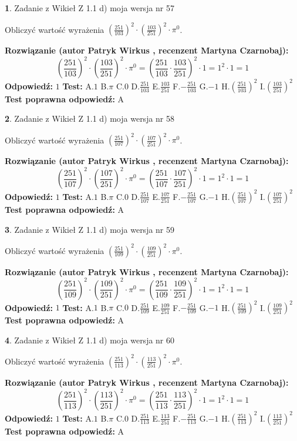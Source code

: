 \documentclass[12pt, a4paper]{article}
\theoremstyle{definition} %
\newtheorem{zad}{}
\newcommand{\zadStart}[1]{\begin{zad}#1\newline}
\newcommand{\zadStop}{\end{zad}}
\newcommand{\rozwStart}[2]{\noindent \textbf{Rozwiązanie (autor #1 , recenzent #2): }\newline}
\newcommand{\rozwStop}{\newline}
\newcommand{\odpStart}{\noindent \textbf{Odpowiedź:}\newline}
\newcommand{\odpStop}{\newline}
\newcommand{\testStart}{\noindent \textbf{Test:}\newline}
\newcommand{\testStop}{\newline}
\newcommand{\kluczStart}{\noindent \textbf{Test poprawna odpowiedź:}\newline}
\newcommand{\kluczStop}{\newline}
\begin{document}
\zadStart{Zadanie z Wikieł Z 1.1 d) moja wersja nr 57}

Obliczyć wartość wyrażenia $(\frac{251}{103})^{2} \cdot (\frac{103}{251})^{2} \cdot \pi^{0}$.
\zadStop
\rozwStart{Patryk Wirkus}{Martyna Czarnobaj}
$$(\frac{251}{103})^{2} \cdot (\frac{103}{251})^{2} \cdot \pi^{0} = (\frac{251}{103} \cdot \frac{103}{251})^{2} \cdot 1 = 1^{2} \cdot 1 = 1$$
\rozwStop
\odpStart
$1$
\odpStop
\testStart
A.$1$ B.$\pi$ C.$0$ D.$\frac{251}{103}$ E.$\frac{103}{251}$
F.$-\frac{251}{103}$ G.$-1$
H.$(\frac{251}{103})^{2}$
I.$(\frac{103}{251})^{2}$
\testStop
\kluczStart
A
\kluczStop



\zadStart{Zadanie z Wikieł Z 1.1 d) moja wersja nr 58}

Obliczyć wartość wyrażenia $(\frac{251}{107})^{2} \cdot (\frac{107}{251})^{2} \cdot \pi^{0}$.
\zadStop
\rozwStart{Patryk Wirkus}{Martyna Czarnobaj}
$$(\frac{251}{107})^{2} \cdot (\frac{107}{251})^{2} \cdot \pi^{0} = (\frac{251}{107} \cdot \frac{107}{251})^{2} \cdot 1 = 1^{2} \cdot 1 = 1$$
\rozwStop
\odpStart
$1$
\odpStop
\testStart
A.$1$ B.$\pi$ C.$0$ D.$\frac{251}{107}$ E.$\frac{107}{251}$
F.$-\frac{251}{107}$ G.$-1$
H.$(\frac{251}{107})^{2}$
I.$(\frac{107}{251})^{2}$
\testStop
\kluczStart
A
\kluczStop



\zadStart{Zadanie z Wikieł Z 1.1 d) moja wersja nr 59}

Obliczyć wartość wyrażenia $(\frac{251}{109})^{2} \cdot (\frac{109}{251})^{2} \cdot \pi^{0}$.
\zadStop
\rozwStart{Patryk Wirkus}{Martyna Czarnobaj}
$$(\frac{251}{109})^{2} \cdot (\frac{109}{251})^{2} \cdot \pi^{0} = (\frac{251}{109} \cdot \frac{109}{251})^{2} \cdot 1 = 1^{2} \cdot 1 = 1$$
\rozwStop
\odpStart
$1$
\odpStop
\testStart
A.$1$ B.$\pi$ C.$0$ D.$\frac{251}{109}$ E.$\frac{109}{251}$
F.$-\frac{251}{109}$ G.$-1$
H.$(\frac{251}{109})^{2}$
I.$(\frac{109}{251})^{2}$
\testStop
\kluczStart
A
\kluczStop



\zadStart{Zadanie z Wikieł Z 1.1 d) moja wersja nr 60}

Obliczyć wartość wyrażenia $(\frac{251}{113})^{2} \cdot (\frac{113}{251})^{2} \cdot \pi^{0}$.
\zadStop
\rozwStart{Patryk Wirkus}{Martyna Czarnobaj}
$$(\frac{251}{113})^{2} \cdot (\frac{113}{251})^{2} \cdot \pi^{0} = (\frac{251}{113} \cdot \frac{113}{251})^{2} \cdot 1 = 1^{2} \cdot 1 = 1$$
\rozwStop
\odpStart
$1$
\odpStop
\testStart
A.$1$ B.$\pi$ C.$0$ D.$\frac{251}{113}$ E.$\frac{113}{251}$
F.$-\frac{251}{113}$ G.$-1$
H.$(\frac{251}{113})^{2}$
I.$(\frac{113}{251})^{2}$
\testStop
\kluczStart
A
\kluczStop
\end{document}
